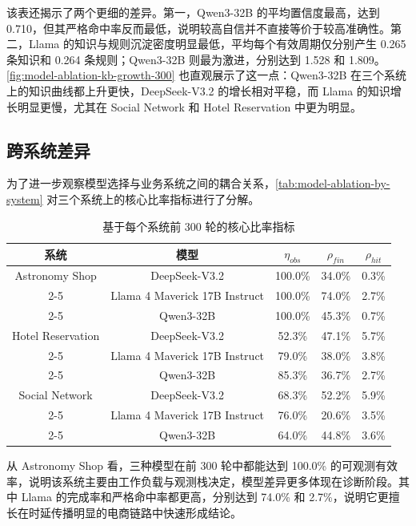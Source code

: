 该表还揭示了两个更细的差异。第一，Qwen3-32B 的平均置信度最高，达到 0.710，但其严格命中率反而最低，说明较高自信并不直接等价于较高准确性。第二，Llama 的知识与规则沉淀密度明显最低，平均每个有效周期仅分别产生 0.265 条知识和 0.264 条规则；Qwen3-32B 则最为激进，分别达到 1.528 和 1.809。\autoref{fig:model-ablation-kb-growth-300} 也直观展示了这一点：Qwen3-32B 在三个系统上的知识曲线都上升更快，DeepSeek-V3.2 的增长相对平稳，而 Llama 的知识增长明显更慢，尤其在 Social Network 和 Hotel Reservation 中更为明显。

\subsection{跨系统差异}

为了进一步观察模型选择与业务系统之间的耦合关系，\autoref{tab:model-ablation-by-system} 对三个系统上的核心比率指标进行了分解。

\begin{table}[htbp]
    \centering
    \caption{基于每个系统前 300 轮的核心比率指标}
    \label{tab:model-ablation-by-system}
    \small
    \begin{tabular}{ c c c c c}
        \toprule
        系统 & 模型 & $\eta_{obs}$ & $\rho_{fin}$ & $\rho_{hit}$ \\
        \midrule
        Astronomy Shop & DeepSeek-V3.2 & 100.0\% & 34.0\% & 0.3\% \\ \cline{2-5}
         & Llama 4 Maverick 17B Instruct & 100.0\% & 74.0\% & 2.7\% \\ \cline{2-5}
         & Qwen3-32B & 100.0\% & 45.3\% & 0.7\% \\
        \midrule
        Hotel Reservation & DeepSeek-V3.2 & 52.3\% & 47.1\% & 5.7\% \\ \cline{2-5}
         & Llama 4 Maverick 17B Instruct & 79.0\% & 38.0\% & 3.8\% \\ \cline{2-5}
         & Qwen3-32B & 85.3\% & 36.7\% & 2.7\% \\
        \midrule
        Social Network & DeepSeek-V3.2 & 68.3\% & 52.2\% & 5.9\% \\ \cline{2-5}
         & Llama 4 Maverick 17B Instruct & 76.0\% & 20.6\% & 3.5\% \\ \cline{2-5}
         & Qwen3-32B & 64.0\% & 44.8\% & 3.6\% \\
        \bottomrule
    \end{tabular}
\end{table}

从 Astronomy Shop 看，三种模型在前 300 轮中都能达到 100.0\% 的可观测有效率，说明该系统主要由工作负载与观测栈决定，模型差异更多体现在诊断阶段。其中 Llama 的完成率和严格命中率都更高，分别达到 74.0\% 和 2.7\%，说明它更擅长在时延传播明显的电商链路中快速形成结论。

